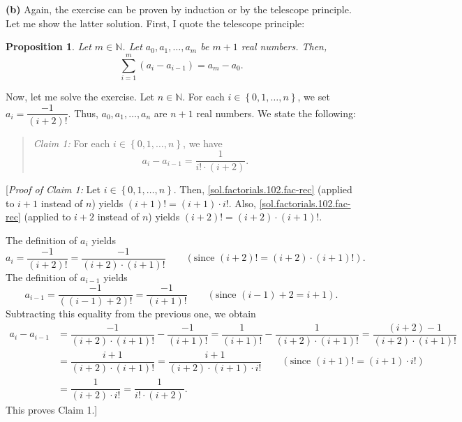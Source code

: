 \documentclass[paper=a4, fontsize=12pt]{scrartcl}%
\let\sumnonlimits\sum
\renewcommand{\sum}{\sumnonlimits\limits}
\theoremstyle{plainsl}
\newtheorem{proposition}[theorem]{Proposition}
\theoremstyle{definition}
\theoremstyle{remark}
\newenvironment{statement}{\begin{quote}}{\end{quote}}
\begin{document}
\vspace{0.806pc}

\textbf{(b)} Again, the exercise can be proven by induction or by the
telescope principle. Let me show the latter solution. First, I quote the
telescope principle:

\begin{proposition}
\label{prop.sums.telescope}Let $m\in\mathbb{N}$. Let $a_{0},a_{1},\ldots
,a_{m}$ be $m+1$ real numbers. Then,
\[
\sum_{i=1}^{m}\left(  a_{i}-a_{i-1}\right)  =a_{m}-a_{0}.
\]

\end{proposition}

Now, let me solve the exercise. Let $n\in\mathbb{N}$. For each $i\in\left\{
0,1,\ldots,n\right\}  $, we set $a_{i}=\dfrac{-1}{\left(  i+2\right)  !}$.
Thus, $a_{0},a_{1},\ldots,a_{n}$ are $n+1$ real numbers. We state the following:

\begin{statement}
\textit{Claim 1:} For each $i\in\left\{  0,1,\ldots,n\right\}  $, we have%
\[
a_{i}-a_{i-1}=\dfrac{1}{i!\cdot\left(  i+2\right)  }.
\]

\end{statement}

[\textit{Proof of Claim 1:} Let $i\in\left\{  0,1,\ldots,n\right\}  $. Then,
\eqref{sol.factorials.102.fac-rec} (applied to $i+1$ instead of $n$) yields
$\left(  i+1\right)  !=\left(  i+1\right)  \cdot i!$. Also,
\eqref{sol.factorials.102.fac-rec} (applied to $i+2$ instead of $n$) yields
$\left(  i+2\right)  !=\left(  i+2\right)  \cdot\left(  i+1\right)  !$.

The definition of $a_{i}$ yields%
\[
a_{i}=\dfrac{-1}{\left(  i+2\right)  !}=\dfrac{-1}{\left(  i+2\right)
\cdot\left(  i+1\right)  !}\qquad\left(  \text{since }\left(  i+2\right)
!=\left(  i+2\right)  \cdot\left(  i+1\right)  !\right)  .
\]
The definition of $a_{i-1}$ yields%
\[
a_{i-1}=\dfrac{-1}{\left(  \left(  i-1\right)  +2\right)  !}=\dfrac
{-1}{\left(  i+1\right)  !}\qquad\left(  \text{since }\left(  i-1\right)
+2=i+1\right)  .
\]
Subtracting this equality from the previous one, we obtain
\begin{align*}
a_{i}-a_{i-1}  &  =\dfrac{-1}{\left(  i+2\right)  \cdot\left(  i+1\right)
!}-\dfrac{-1}{\left(  i+1\right)  !}=\dfrac{1}{\left(  i+1\right)  !}%
-\dfrac{1}{\left(  i+2\right)  \cdot\left(  i+1\right)  !}=\dfrac{\left(
i+2\right)  -1}{\left(  i+2\right)  \cdot\left(  i+1\right)  !}\\
&  =\dfrac{i+1}{\left(  i+2\right)  \cdot\left(  i+1\right)  !}=\dfrac
{i+1}{\left(  i+2\right)  \cdot\left(  i+1\right)  \cdot i!}\qquad\left(
\text{since }\left(  i+1\right)  !=\left(  i+1\right)  \cdot i!\right) \\
&  =\dfrac{1}{\left(  i+2\right)  \cdot i!}=\dfrac{1}{i!\cdot\left(
i+2\right)  }.
\end{align*}
This proves Claim 1.]
\end{document}
